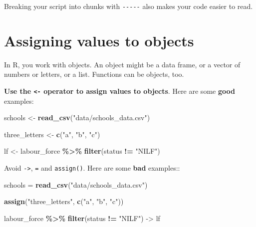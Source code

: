 \documentclass[
]{book}
\newenvironment{Shaded}{\begin{snugshade}}{\end{snugshade}}
\newcommand{\KeywordTok}[1]{\textcolor[rgb]{0.13,0.29,0.53}{\textbf{#1}}}
\newcommand{\NormalTok}[1]{#1}
\newcommand{\OperatorTok}[1]{\textcolor[rgb]{0.81,0.36,0.00}{\textbf{#1}}}
\newcommand{\StringTok}[1]{\textcolor[rgb]{0.31,0.60,0.02}{#1}}
\begin{document}
Breaking your script into chunks with \texttt{-\/-\/-\/-\/-} also makes your code easier to read.

\hypertarget{assigning-values-to-objects}{%
\section{Assigning values to objects}\label{assigning-values-to-objects}}

In R, you work with objects. An object might be a data frame, or a vector of numbers or letters, or a list. Functions can be objects, too.

\textbf{Use the \texttt{\textless{}-} operator to assign values to objects}. Here are some \textbf{good} examples:

\begin{Shaded}
\begin{Highlighting}[]
\NormalTok{schools \textless{}{-}}\StringTok{ }\KeywordTok{read\_csv}\NormalTok{(}\StringTok{"data/schools\_data.csv"}\NormalTok{)}

\NormalTok{three\_letters \textless{}{-}}\StringTok{ }\KeywordTok{c}\NormalTok{(}\StringTok{"a"}\NormalTok{, }\StringTok{"b"}\NormalTok{, }\StringTok{"c"}\NormalTok{)}

\NormalTok{lf \textless{}{-}}\StringTok{ }\NormalTok{labour\_force }\OperatorTok{\%\textgreater{}\%}
\StringTok{  }\KeywordTok{filter}\NormalTok{(status }\OperatorTok{!=}\StringTok{ "NILF"}\NormalTok{)}
\end{Highlighting}
\end{Shaded}

Avoid \texttt{-\textgreater{}}, \texttt{=} and \texttt{assign()}. Here are some \textbf{bad} examples::

\begin{Shaded}
\begin{Highlighting}[]
\NormalTok{schools =}\StringTok{ }\KeywordTok{read\_csv}\NormalTok{(}\StringTok{"data/schools\_data.csv"}\NormalTok{)}

\KeywordTok{assign}\NormalTok{(}\StringTok{"three\_letters"}\NormalTok{, }\KeywordTok{c}\NormalTok{(}\StringTok{"a"}\NormalTok{, }\StringTok{"b"}\NormalTok{, }\StringTok{"c"}\NormalTok{))}

\NormalTok{labour\_force }\OperatorTok{\%\textgreater{}\%}
\StringTok{  }\KeywordTok{filter}\NormalTok{(status }\OperatorTok{!=}\StringTok{ "NILF"}\NormalTok{) {-}\textgreater{}}\StringTok{ }\NormalTok{lf}
\end{Highlighting}
\end{Shaded}
\end{document}
